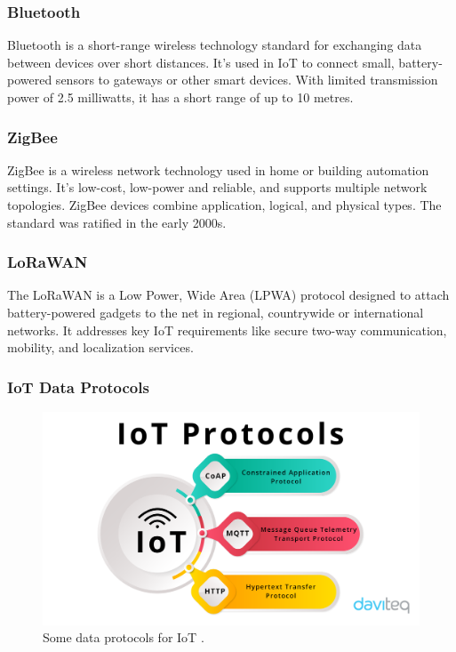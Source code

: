 \documentclass[12pt]{report}
\begin{document}
	\subsubsection*{Bluetooth}
	Bluetooth is a short-range wireless technology standard for exchanging data between devices over short distances. It's used in IoT to connect small, battery-powered sensors to gateways or other smart devices. With limited transmission power of 2.5 milliwatts, it has a short range of up to 10 metres.
	\subsubsection*{ZigBee}
	ZigBee is a wireless network technology used in home or building automation settings. It's low-cost, low-power and reliable, and supports multiple network topologies. ZigBee devices combine application, logical, and physical types. The standard was ratified in the early 2000s.\cite{inproceedings}
	\subsubsection*{LoRaWAN}
	The LoRaWAN is a Low Power, Wide Area (LPWA) protocol designed to attach battery-powered gadgets to the net in regional, countrywide or international networks. It addresses key IoT requirements like secure two-way communication, mobility, and localization services.\cite{lorawanSpec}
	\subsubsection {IoT Data Protocols}
		\begin{figure}[H]
		\centering
		\includegraphics[width=1\textwidth]{coap}
		\caption{Some data protocols for IoT 
			\cite{daviteq}.}
		\label{fig:3layers}
	\end{figure}
\end{document}
